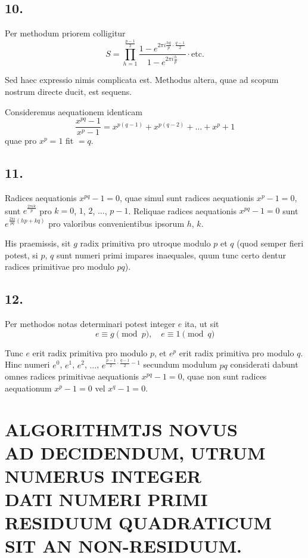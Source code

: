 \documentclass[12pt,a4paper]{article}
\theoremstyle{plain}
\theoremstyle{definition}
\theoremstyle{remark}
\begin{document}
\subsection*{10.}
Per methodum priorem colligitur
\[S = \prod_{h=1}^{\frac{p-1}{2}} \frac{1-e^{2\pi i\frac{hq}{p}\cdot\frac{q-1}{2}}}{1-e^{2\pi i\frac{h}{p}}} \cdot \text{etc.}\]

Sed haec expressio nimis complicata est. Methodus altera, quae ad scopum nostrum directe ducit, est sequens.

Consideremus aequationem identicam
\[\frac{x^{pq}-1}{x^p-1} = x^{p(q-1)} + x^{p(q-2)} + \ldots + x^p + 1\]
quae pro $x^p = 1$ fit $=q$.

\subsection*{11.}
Radices aequationis $x^{pq}-1=0$, quae simul sunt radices aequationis $x^p-1=0$, sunt $e^{\frac{2\pi ik}{p}}$ pro $k=0$, $1$, $2$, $\ldots$, $p-1$. Reliquae radices aequationis $x^{pq}-1=0$ sunt $e^{\frac{2\pi i}{pq}(hp+kq)}$ pro valoribus convenientibus ipsorum $h$, $k$.

His praemissis, sit $g$ radix primitiva pro utroque modulo $p$ et $q$ (quod semper fieri potest, si $p$, $q$ sunt numeri primi impares inaequales, quum tunc certo dentur radices primitivae pro modulo $pq$).

\subsection*{12.}
Per methodos notas determinari potest integer $e$ ita, ut sit
\[e \equiv g \pmod{p}, \quad e \equiv 1 \pmod{q}\]

Tunc $e$ erit radix primitiva pro modulo $p$, et $e^p$ erit radix primitiva pro modulo $q$. Hinc numeri $e^0$, $e^1$, $e^2$, $\ldots$, $e^{\frac{p-1}{2}\cdot\frac{q-1}{2}-1}$ secundum modulum $pq$ considerati dabunt omnes radices primitivae aequationis $x^{pq}-1=0$, quae non sunt radices aequationum $x^p-1=0$ vel $x^q-1=0$.

\newpage
\section*{ALGORITHMTJS NOVUS\\AD DECIDENDUM, UTRUM NUMERUS INTEGER\\DATI NUMERI PRIMI RESIDUUM QUADRATICUM\\SIT AN NON-RESIDUUM.}
\end{document}
